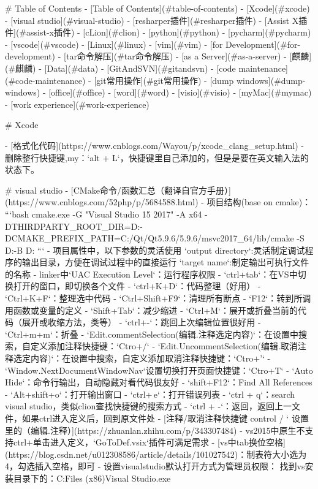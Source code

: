 # Table of Contents
- [Table of Contents](#table-of-contents)
- [Xcode](#xcode)
- [visual studio](#visual-studio)
  - [resharper插件](#resharper插件)
  - [Assist X插件](#assist-x插件)
- [cLion](#clion)
- [python](#python)
  - [pycharm](#pycharm)
- [vscode](#vscode)
- [Linux](#linux)
  - [vim](#vim)
  - [for Development](#for-development)
    - [tar命令解压](#tar命令解压)
  - [as a Server](#as-a-server)
  - [麒麟](#麒麟)
- [Data](#data)
- [GitAndSVN](#gitandsvn)
  - [code maintenance](#code-maintenance)
  - [git常用操作](#git常用操作)
- [dump windows](#dump-windows)
  - [office](#office)
    - [word](#word)
    - [visio](#visio)
- [myMac](#mymac)
- [work experience](#work-experience)

# Xcode

- [格式化代码](https://www.cnblogs.com/Wayou/p/xcode_clang_setup.html)
- 删除整行快捷键,my：`alt + L`，快捷键里自己添加的，但是是要在英文输入法的状态下。


# visual studio
- [CMake命令/函数汇总（翻译自官方手册）](https://www.cnblogs.com/52php/p/5684588.html)
- 项目结构(base on cmake)：
```bash
cmake.exe -G "Visual Studio 15 2017" -A x64 -DTHIRDPARTY_ROOT_DIR=D:\myDevelop\ThirdParty -DCMAKE_PREFIX_PATH=C:/Qt/Qt5.9.6/5.9.6/msvc2017_64/lib/cmake -S D:\myDevelop\project{}\src -B D:\myDevelop\build{}
```
-  项目属性中，以下参数的灵活使用
`output directory`:灵活制定调试程序的输出目录，方便在调试过程中的直接运行
`target name`:制定输出可执行文件的名称
- linker中`UAC Execution Level`：运行程序权限
- `ctrl+tab`：在VS中切换打开的窗口，即切换各个文件
- `ctrl+K+D`：代码整理（好用）
- `Ctrl+K+F`：整理选中代码
- `Ctrl+Shift+F9`：清理所有断点
- `F12`：转到所调用函数或变量的定义
- `Shift+Tab`：减少缩进
- `Ctrl+M`：展开或折叠当前的代码（展开或收缩方法，类等）
- `ctrl+-`：跳回上次编辑位置很好用
- `Ctrl+m+m`：折叠
- `Edit.commentSelection(编辑.注释选定内容)`：在设置中搜索，自定义添加注释快捷键：`Ctro+/`
- `Edit.UncommentSelection(编辑.取消注释选定内容)`：在设置中搜索，自定义添加取消注释快捷键：`Ctro+'`
- `Window.NextDocumentWindowNav`设置切换打开页面快捷键：`Ctro+T`
- `Auto Hide`：命令行输出，自动隐藏对看代码很友好
- `shift+F12`：Find All References
- `Alt+shift+o`：打开输出窗口
- `ctrl+\,e`：打开错误列表
- `ctrl + q`：search visual studio，类似clion查找快捷键的搜索方式
- `ctrl + -`：返回，返回上一文件，如果ctrl进入定义后，回到原文件处
- [注释/取消注释快捷键  control / ‘ 设置里的（编辑.注释）](https://zhuanlan.zhihu.com/p/343307484)
- vs2015中原生不支持ctrl+单击进入定义，`GoToDef.vsix`插件可满足需求
- [vs中tab换位空格](https://blog.csdn.net/u012308586/article/details/101027542)：制表符大小选为4，勾选插入空格，即可
- 设置visualstudio默认打开方式为管理员权限：
找到vs安装目录下的：C:\Program Files (x86)\Microsoft Visual Studio\Community{}\IDE\devenv.exe

